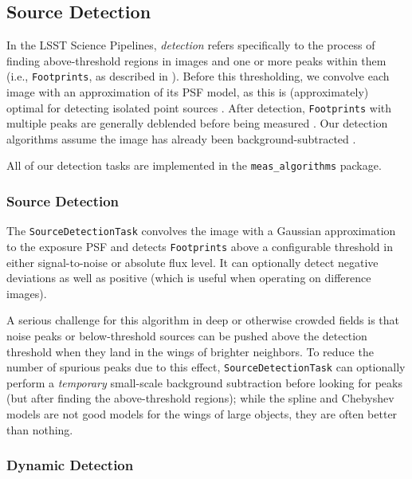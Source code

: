 \subsection{Source Detection}
\label{sec:detection}

In the LSST Science Pipelines, \emph{detection} refers specifically to the process of finding above-threshold regions in images and one or more peaks within them (i.e., \texttt{Footprints}, as described in ).
Before this thresholding, we convolve each image with an approximation of its PSF model, as this is (approximately) optimal for detecting isolated point sources \citep{2018PASJ...70S...5B}.
After detection, \texttt{Footprints} with multiple peaks are generally deblended  before being measured .
Our detection algorithms assume the image has already been background-subtracted .

All of our detection tasks are implemented in the \texttt{meas\_algorithms} package.

\subsubsection{Source Detection}
\label{sec:SourceDetectionTask}

The \texttt{SourceDetectionTask} convolves the image with a Gaussian approximation to the exposure PSF and detects \texttt{Footprints} above a configurable threshold in either signal-to-noise or absolute flux level.
It can optionally detect negative deviations as well as positive (which is useful when operating on difference images).

A serious challenge for this algorithm in deep or otherwise crowded fields is that noise peaks or below-threshold sources can be pushed above the detection threshold when they land in the wings of brighter neighbors.
To reduce the number of spurious peaks due to this effect, \texttt{SourceDetectionTask} can optionally perform a \emph{temporary} small-scale background subtraction before looking for peaks (but after finding the above-threshold regions); while the spline and Chebyshev models are not good models for the wings of large objects, they are often better than nothing.

\subsubsection{Dynamic Detection}
\label{sec:DynamicDetectionTask}

